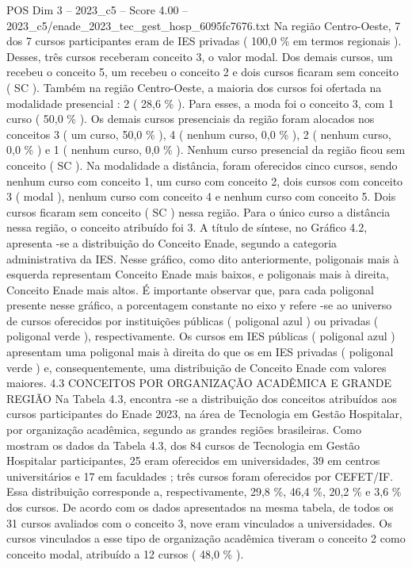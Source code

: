 \begin{textsample}{POS Dim 3 – 2023\_c5 – Score 4.00 – 2023\_c5/enade\_2023\_tec\_gest\_hosp\_6095fc7676.txt}
Na região Centro-Oeste, 7 dos 7 cursos participantes eram de IES privadas ( 100,0 \% em termos regionais ).
Desses, três cursos receberam conceito 3, o valor modal.
Dos demais cursos, um recebeu o conceito 5, um recebeu o conceito 2 e dois cursos ficaram sem conceito ( SC ).
Também na região Centro-Oeste, a maioria dos cursos foi ofertada na modalidade presencial : 2 ( 28,6 \% ).
Para esses, a moda foi o conceito 3, com 1 curso ( 50,0 \% ).
Os demais cursos presenciais da região foram alocados nos conceitos 3 ( um curso, 50,0 \% ), 4 ( nenhum curso, 0,0 \% ), 2 ( nenhum curso, 0,0 \% ) e 1 ( nenhum curso, 0,0 \% ).
Nenhum curso presencial da região ficou sem conceito ( SC ).
Na modalidade a distância, foram oferecidos cinco cursos, sendo nenhum curso com conceito 1, um curso com conceito 2, dois cursos com conceito 3 ( modal ), nenhum curso com conceito 4 e nenhum curso com conceito 5.
Dois cursos ficaram sem conceito ( SC ) nessa região.
Para o único curso a distância nessa região, o conceito atribuído foi 3.
A título de síntese, no Gráfico 4.2, apresenta -se a distribuição do Conceito Enade, segundo a categoria administrativa da IES.
Nesse gráfico, como dito anteriormente, poligonais mais à esquerda representam Conceito Enade mais baixos, e poligonais mais à direita, Conceito Enade mais altos.
É importante observar que, para cada poligonal presente nesse gráfico, a porcentagem constante no eixo y refere -se ao universo de cursos oferecidos por instituições públicas ( poligonal azul ) ou privadas ( poligonal verde ), respectivamente.
Os cursos em IES públicas ( poligonal azul ) apresentam uma poligonal mais à direita do que os em IES privadas ( poligonal verde ) e, consequentemente, uma distribuição de Conceito Enade com valores maiores. 4.3 CONCEITOS POR ORGANIZAÇÃO ACADÊMICA E GRANDE REGIÃO Na Tabela 4.3, encontra -se a distribuição dos conceitos atribuídos aos cursos participantes do Enade 2023, na área de Tecnologia em Gestão Hospitalar, por organização acadêmica, segundo as grandes regiões brasileiras.
Como mostram os dados da Tabela 4.3, dos 84 cursos de Tecnologia em Gestão Hospitalar participantes, 25 eram oferecidos em universidades, 39 em centros universitários e 17 em faculdades ; três cursos foram oferecidos por CEFET/IF.
Essa distribuição corresponde a, respectivamente, 29,8 \%, 46,4 \%, 20,2 \% e 3,6 \% dos cursos.
De acordo com os dados apresentados na mesma tabela, de todos os 31 cursos avaliados com o conceito 3, nove eram vinculados a universidades.
Os cursos vinculados a esse tipo de organização acadêmica tiveram o conceito 2 como conceito modal, atribuído a 12 cursos ( 48,0 \% ).

\end{textsample}
